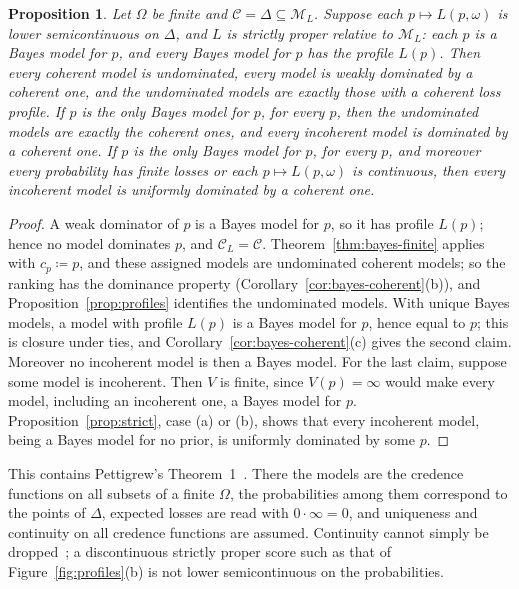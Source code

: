 \documentclass[11pt]{article}
\newtheorem{proposition}[theorem]{Proposition}
\theoremstyle{definition}
\theoremstyle{remark}
\newcommand{\M}{\mathcal M}
\newcommand{\C}{\mathcal C}
\begin{document}
\begin{proposition}\label{prop:proper}
Let $\Omega$ be finite and $\C=\Delta\subseteq\M_L$. Suppose each $p\mapsto L(p,\omega)$ is lower semicontinuous on $\Delta$, and $L$ is \emph{strictly proper relative to $\M_L$}: each $p$ is a Bayes model for $p$, and every Bayes model for $p$ has the profile $L(p)$. Then every coherent model is undominated, every model is weakly dominated by a coherent one, and the undominated models are exactly those with a coherent loss profile. If $p$ is the only Bayes model for $p$, for every $p$, then the undominated models are exactly the coherent ones, and every incoherent model is dominated by a coherent one. If $p$ is the only Bayes model for $p$, for every $p$, and moreover every probability has finite losses or each $p\mapsto L(p,\omega)$ is continuous, then every incoherent model is uniformly dominated by a coherent one.
\end{proposition}
\begin{proof}
A weak dominator of $p$ is a Bayes model for $p$, so it has profile $L(p)$; hence no model dominates $p$, and $\C_L=\C$. Theorem~\ref{thm:bayes-finite} applies with $c_p\coloneqq p$, and these assigned models are undominated coherent models; so the ranking has the dominance property (Corollary~\ref{cor:bayes-coherent}(b)), and Proposition~\ref{prop:profiles} identifies the undominated models. With unique Bayes models, a model with profile $L(p)$ is a Bayes model for $p$, hence equal to $p$; this is closure under ties, and Corollary~\ref{cor:bayes-coherent}(c) gives the second claim. Moreover no incoherent model is then a Bayes model. For the last claim, suppose some model is incoherent. Then $V$ is finite, since $V(p)=\infty$ would make every model, including an incoherent one, a Bayes model for $p$. Proposition~\ref{prop:strict}, case (a) or (b), shows that every incoherent model, being a Bayes model for no prior, is uniformly dominated by some $p$.
\end{proof}

This contains Pettigrew's Theorem~1~\cite{Pettigrew}. There the models are the credence functions on all subsets of a finite $\Omega$, the probabilities among them correspond to the points of $\Delta$, expected losses are read with $0\cdot\infty=0$, and uniqueness and continuity on all credence functions are assumed. Continuity cannot simply be dropped~\cite{SSK09}; a discontinuous strictly proper score such as that of Figure~\ref{fig:profiles}(b) is not lower semicontinuous on the probabilities.
\end{document}
